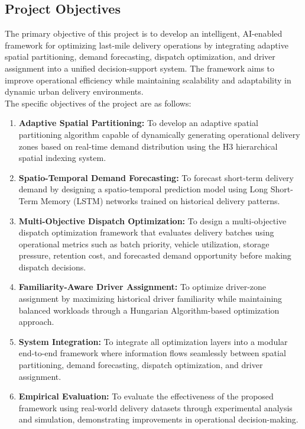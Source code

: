 \documentclass{article}
\begin{document}
\subsection{Project Objectives}
\label{subsec:project_objectives}
The primary objective of this project is to develop an intelligent, AI-enabled framework for optimizing last-mile delivery operations by integrating adaptive spatial partitioning, demand forecasting, dispatch optimization, and driver assignment into a unified decision-support system. The framework aims to improve operational efficiency while maintaining scalability and adaptability in dynamic urban delivery environments.\\
The specific objectives of the project are as follows:
\begin{enumerate}
    \item \textbf{Adaptive Spatial Partitioning:} To develop an adaptive spatial partitioning algorithm capable of dynamically generating operational delivery zones based on real-time demand distribution using the H3 hierarchical spatial indexing system.
    
    \item \textbf{Spatio-Temporal Demand Forecasting:} To forecast short-term delivery demand by designing a spatio-temporal prediction model using Long Short-Term Memory (LSTM) networks trained on historical delivery patterns.
    
    \item \textbf{Multi-Objective Dispatch Optimization:} To design a multi-objective dispatch optimization framework that evaluates delivery batches using operational metrics such as batch priority, vehicle utilization, storage pressure, retention cost, and forecasted demand opportunity before making dispatch decisions.
    
    \item \textbf{Familiarity-Aware Driver Assignment:} To optimize driver-zone assignment by maximizing historical driver familiarity while maintaining balanced workloads through a Hungarian Algorithm-based optimization approach.
    
    \item \textbf{System Integration:} To integrate all optimization layers into a modular end-to-end framework where information flows seamlessly between spatial partitioning, demand forecasting, dispatch optimization, and driver assignment.
    
    \item \textbf{Empirical Evaluation:} To evaluate the effectiveness of the proposed framework using real-world delivery datasets through experimental analysis and simulation, demonstrating improvements in operational decision-making.
\end{enumerate}
\end{document}
